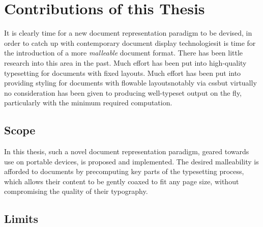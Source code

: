 \section{Contributions of this Thesis}

It is clearly time for a new document representation paradigm to be devised, in order to catch up with contemporary document display technologies\ed it is time for the introduction of a more \emph{malleable} document format. There has been little research into this area in the past. Much effort has been put into high-quality typesetting for documents with fixed layouts. Much effort has been put into providing styling for documents with flowable layouts\ed notably via css\ed but virtually no consideration has been given to producing well-typeset output on the fly, particularly with the minimum required computation.

\subsection{Scope}
In this thesis, such a novel document representation paradigm, geared towards use on portable devices, is proposed and implemented. The desired malleability is afforded to documents by precomputing key parts of the typesetting process, which allows their content to be gently coaxed to fit any page size, without compromising the quality of their typography.



\subsection{Limits}

